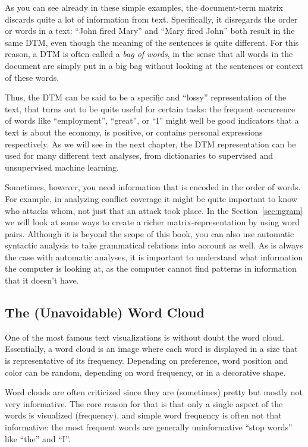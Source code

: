 As you can see already in these simple examples, the document-term matrix discards quite a lot of information from text.
Specifically, it disregards the order or words in a text: ``John fired Mary'' and ``Mary fired John'' both result in the same DTM,
even though the meaning of the sentences is quite different.
For this reason, a DTM is often called a \emph{bag of words}, in the sense that all words in the document are simply put in a big bag
without looking at the sentences or context of these words.

Thus, the DTM can be said to be a specific and ``lossy'' representation of the text, that turns out to be quite useful for certain tasks:
the frequent occurrence of words like ``employment'', ``great'', or ``I'' might well be good indicators that a text is about the economy,
is positive, or contains personal expressions respectively.
As we will see in the next chapter, the DTM representation can be used for many different text analyses, from dictionaries to supervised and unsupervised machine learning.

Sometimes, however, you need information that is encoded in the order of words.
For example, in analyzing conflict coverage it might be quite important to know who attacks whom, not just that an attack took place.
In the Section~\ref{sec:ngram} we will look at some ways to create a richer matrix-representation by using word pairs.
Although it is beyond the scope of this book,
you can also use automatic syntactic analysis to take grammatical relations into account as well.
As is always the case with automatic analyses, it is important to understand what information the computer is looking at,
as the computer cannot find patterns in information that it doesn't have.

\subsection{The (Unavoidable) Word Cloud}

 One of the most famous text visualizations is without doubt the word cloud.
Essentially, a word cloud is an image where each word is displayed in a size that is representative of its frequency.
Depending on preference, word position and color can be random, depending on word frequency, or in a decorative shape.

Word clouds are often criticized since they are (sometimes) pretty but mostly not very informative.
The core reason for that is that only a single aspect of the words is visualized (frequency),
and simple word frequency is often not that informative: the most frequent words are generally uninformative ``stop words'' like ``the'' and ``I''.

